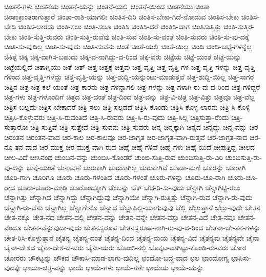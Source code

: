 {ಚಿಂತನೆ-ಗಳು
ಚಿಂತನೆಯ
ಚಿಂತನೆ-ಯನ್ನು
ಚಿಂತನೆ-ಯಲ್ಲಿ
ಚಿಂತನೆ-ಯಿಂದ
ಚಿಂತನೆಯು
ಚಿಂತಾ
ಚಿಂತಾಕ್ರಾಂತರಾಗುತ್ತಾರೆ
ಚಿಂತಾ-ರಾಶಿ-ಯಾಗಲೀ
ಚಿಂತಿಸ-ದಿರಿ
ಚಿಂತಿಸ-ಬೇಕಾ-ಗಿದೆ-ನೋಡುವ
ಚಿಂತಿಸ-ಬೇಕು
ಚಿಂತಿಸ-ಬೇಡಿ
ಚಿಂತಿಸ-ಲಾರದು
ಚಿಂತಿ-ಸಲು
ಚಿಂತಿ-ಸಲೂ
ಚಿಂತಿಸಿ
ಚಿಂತಿಸಿ-ದರೆ
ಚಿಂತಿಸಿ-ದಾಗ
ಚಿಂತಿಸುತ್ತಿತ್ತು
ಚಿಂತಿ-ಸುತ್ತಿರ-ಬೇಕು
ಚಿಂತಿ-ಸುತ್ತಿ-ರುವರು
ಚಿಂತಿ-ಸುತ್ತಿ-ರುವೆವು
ಚಿಂತಿ-ಸುವ
ಚಿಂತಿ-ಸು-ವಂತೆ
ಚಿಂತಿ-ಸುವರು
ಚಿಂತಿ-ಸು-ವು-ದಕ್ಕೆ
ಚಿಂತಿ-ಸು-ವುದಿಲ್ಲ
ಚಿಂತಿ-ಸು-ವುದು
ಚಿಂತಿ-ಸುವೆನು
ಚಿಂತೆ
ಚಿಂತೆ-ಯಲ್ಲಿ
ಚಿಂತೆ-ಯಿಲ್ಲ
ಚಿಂದಿ
ಚಿಂದಿ-ಬಟ್ಟೆ-ಗಳನ್ನೆಲ್ಲ
ಚಿಕಿತ್ಸೆ
ಚಿಕ್ಕ
ಚಿಕ್ಕ-ದಾಗಿಸ-ಬಹುದು
ಚಿಕ್ಕ-ವ-ನಾಗಿದ್ದು-ದ-ರಿಂದ
ಚಿಕ್ಕ-ವರು
ಚಿಟ್ಟೆಯ
ಚಿಟ್ಟೆ-ಯಂತೆ
ಚಿಟ್ಟೆ-ಯನ್ನು
ಚಿಟ್ಟೆಯಲ್ಲಿದೆ
ಚಿತಾಗ್ನಿಯು
ಚಿತೆ
ಚಿತ್
ಚಿತ್ತ
ಚಿತ್ತಕ್ಕೆ
ಚಿತ್ತವು
ಚಿತ್ತ-ವೃತ್ತಿ
ಚಿತ್ತ-ವೃತ್ತಿ-ಗಳ
ಚಿತ್ತ-ವೃತ್ತಿ-ಗಳನ್ನು
ಚಿತ್ತ-ವೃತ್ತಿ-ಗಳಿಂದ
ಚಿತ್ತ-ವೃತ್ತಿ-ಗಳೆದ್ದು
ಚಿತ್ತ-ವೃತ್ತಿ-ಯನ್ನು
ಚಿತ್ತ-ಶುದ್ದಿ-ಯನ್ನುಂಟು-ಮಾಡುತ್ತವೆ
ಚಿತ್ತ-ಶುದ್ದಿ-ಯಿಲ್ಲ
ಚಿತ್ತ-ಸಾಗರ
ಚಿತ್ತಿನ
ಚಿತ್ರ
ಚಿತ್ರ-ಕಲೆ-ಯಂತೆ
ಚಿತ್ರ-ಕಾರನು
ಚಿತ್ರ-ಗಳನ್ನಾಗಲಿ
ಚಿತ್ರ-ಗಳನ್ನು
ಚಿತ್ರ-ಗಳಾಗಿ-ರು-ವು-ದ-ರಿಂದ
ಚಿತ್ರ-ಗಳಿದ್ದರೆ
ಚಿತ್ರ-ಗಳು
ಚಿತ್ರ-ಗಳೊಂದಿಗೆ
ಚಿತ್ರದ
ಚಿತ್ರ-ದಂತೆ
ಚಿತ್ರ-ದಿಂದ
ಚಿತ್ರ-ವನ್ನು
ಚಿತ್ರ-ವಿ-ಚಿತ್ರ
ಚಿತ್ರ-ವಿತ್ತು
ಚಿತ್ರವೂ
ಚಿತ್ರ-ವೆಲ್ಲ
ಚಿತ್ರಿಸ-ಬಲ್ಲದು
ಚಿತ್ರಿಸ-ಬೇಕಾದರೆ
ಚಿತ್ರಿ-ಸಲು
ಚಿತ್ರಿ-ಸಲ್ಪಡದೆ
ಚಿತ್ರಿಸಿ-ಕೊಂಡು
ಚಿತ್ರಿಸಿ-ಕೊಳ್ಳ-ಲಾರನು
ಚಿತ್ರಿ-ಸಿ-ಕೊಳ್ಳಿ
ಚಿತ್ರಿಸಿ-ಕೊಳ್ಳುವರು
ಚಿತ್ರಿ-ಸಿ-ರುವಂತಿದೆ
ಚಿತ್ರಿ-ಸಿ-ರುವರು
ಚಿತ್ರಿ-ಸಿ-ರು-ವುದು
ಚಿತ್ರಿ-ಸಿಲ್ಲ
ಚಿತ್ರಿಸುತ್ತಾ-ರೆಂದು
ಚಿತ್ರಿ-ಸುತ್ತಾರೋ
ಚಿತ್ರಿ-ಸುತ್ತಿವೆ
ಚಿತ್ರಿ-ಸುತ್ತೇವೆ
ಚಿತ್ರಿ-ಸುವನು
ಚಿತ್ರಿ-ಸುವರು
ಚಿನ್ನ
ಚಿನ್ನಕ್ಕಾಗಿ
ಚಿನ್ನದ
ಚಿನ್ನದ್ದು
ಚಿನ್ನ-ವನ್ನು
ಚಿರ
ಚಿರಂತನ
ಚಿರಂತನ-ವಾದ
ಚಿರ-ಕಾಲ
ಚಿರ-ಕಾಲವೂ
ಚಿರ-ಜಾಗೃತ
ಚಿರ-ಜಾಗೃತ-ವಾಗಿ-ರುತ್ತವೆ
ಚಿರ-ಜಾಗ್ರತ-ನಾದ
ಚಿರ-ನೂ-ತನ-ವಾದ
ಚಿರ-ಮುಕ್ತ
ಚಿರ-ಮುಕ್ತ-ವಾಗಿ-ರುವ
ಚಿಹ್ನೆ
ಚಿಹ್ನೆ-ಗಳಿವೆ
ಚಿಹ್ನೆ-ಗಳು
ಚಿಹ್ನೆ-ಯಿದೆ
ಚೀಪುತ್ತಿದ್ದ
ಚೀಲದ
ಚೀಲ-ವಿದೆ
ಚೀಸಿನಂಥ
ಚುಂಬನ-ವನ್ನು
ಚುಂಬಿಸಿ-ಕೊಂಡರೆ
ಚುಂಬಿ-ಸುತ್ತಿ-ರುವ
ಚುಂಬಿಸುತ್ತಿ-ರು-ವಿರಿ
ಚುಂಬಿಸುತ್ತಿ-ರು-ವು-ದನ್ನು
ಚುಕ್ಕೆ-ಯಂತೆ
ಚುನಾವಣೆ
ಚುರುಕಾಗಿ
ಚುರುಕಾಗಿಲ್ಲ
ಚುರುಕಾಗಿವೆ
ಚೂಡಾ-ಮಣಿ
ಚೂರನ್ನು
ಚೂರಾಗಿ
ಚೂರಿ-ಗಾಗಿ
ಚೂರಿಗೂ
ಚೂರು
ಚೂರು-ಗಳಂತಿದೆ
ಚೂರು-ಗಳಂತೆ
ಚೂರು-ಗಳನ್ನು
ಚೂರು-ಚೂ-ರಾಗಿ
ಚೂರು-ಚೂ-ರಾದ
ಚೂರು-ಚೂರು-ಮಾಡಿ
ಚೂರೊಂದಕ್ಕಾಗಿ
ಚೆಂಬನ್ನು
ಚೆಕ್
ಚೆದ-ರಿ-ಸು-ವುದು
ಚೆನ್ನಾಗಿ
ಚೆನ್ನಾಗಿಟ್ಟಿ-ರಲು
ಚೆನ್ನಾಗಿತ್ತು
ಚೆನ್ನಾಗಿದೆ
ಚೆನ್ನಾಗಿದ್ದು
ಚೆನ್ನಾಗಿದ್ದುವು
ಚೆನ್ನಾಗಿಯೇ
ಚೆನ್ನಾಗಿ-ರುತ್ತಿತ್ತು
ಚೆನ್ನಾಗಿ-ರುವ
ಚೆನ್ನಾಗಿ-ರು-ವುದು
ಚೆನ್ನಾಗಿ-ರು-ವೆನು
ಚೆನ್ನಾಗಿಲ್ಲ
ಚೆನ್ನಾಗೇನೊ
ಚೆನ್ನಾದ
ಚೆಲ್ಲಾಪಿಲ್ಲಿ-ಯಾಗುವುವು
ಚೆಲ್ಲಿ
ಚೆಲ್ಲುತ್ತಾನೆ
ಚೆಲ್ಲು-ವುದೇ
ಚೇತನ
ಚೇತ-ನಕ್ಕೂ
ಚೇತ-ನದ
ಚೇತನ-ದಲ್ಲಿ
ಚೇತನ-ವನ್ನು
ಚೇತನ-ವನ್ನೇ
ಚೇತನ-ವಸ್ತು
ಚೇತನ-ವಿದೆ
ಚೇತ-ನವೂ
ಚೇತನ-ವೆಂದೂ
ಚೇತನ-ವೆನ್ನುವುದಾ-ವುದು
ಚೇತನಸ್ವರೂಪ
ಚೇತನಸ್ವರೂಪ-ನಾಗಿ-ರು-ವು-ದ-ರಿಂದ
ಚೇತನಾ-ಚೇ-ತನ-ಗಳನ್ನು
ಚೇತ-ರಿಸಿ-ಕೊಳ್ಳುತ್ತಾನೆ
ಚೈತನ್ಯ
ಚೈತನ್ಯ-ದಂತೆ
ಚೈತನ್ಯ-ದಿಂದ
ಚೈತನ್ಯ-ಮಯ
ಚೈತನ್ಯ-ವಿದೆ
ಚೈತನ್ಯವು
ಚೈತನ್ಯವೇ
ಚೈನಾ
ಚೈನಾ-ದೇಶದ
ಚೈನಾ-ದೇಶ-ದ-ವರು
ಚೈನೀ-ಯರು
ಚೊಂಬಿ-ನಲ್ಲಿ
ಚೊಕ್ಕಟ-ವಾಗಿಟ್ಟು-ಕೊಂಡಿ-ರು-ವರು
ಚೋರ
ಚೋರರು
ಚೌಕಟ್ಟನ್ನು
ಚೌಕದ
ಚೌಕಾಸಿ-ಮಾಡ-ಲಾಗು-ವುದಿಲ್ಲ
ಛಂದೋ-ಬದ್ಧ-ವಾದ
ಛಲ
ಛಾಂದೋಗ್ಯ
ಛಾಪಿಸು-ವುದಕ್ಕೇ
ಛಾಯಾ-ಚಿತ್ರ-ವನ್ನು
ಛಾಯೆ
ಛಾಯೆ-ಗಳು
ಛಾಯೆ-ಗಳೇ
ಛಾಯೆಯ
ಛಾಯೆ-ಯನ್ನು
}
